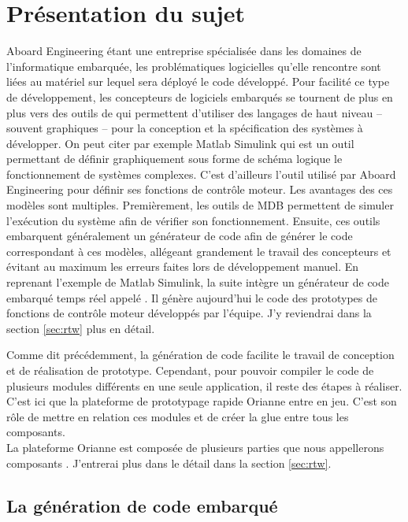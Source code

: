 \chapter{Présentation du sujet}
Aboard Engineering étant une entreprise spécialisée dans les domaines de
l'informatique embarquée, les problématiques logicielles qu'elle rencontre sont
liées au matériel sur lequel sera déployé le code développé. Pour facilité ce
type de développement, les concepteurs de logiciels embarqués se tournent de
plus en plus vers des outils de  qui permettent d'utiliser des langages
de haut niveau -- souvent graphiques -- pour la conception et la spécification
des systèmes à développer. On peut citer par exemple Matlab\up{\circledR}
Simulink\up{\circledR} qui est un outil permettant de définir graphiquement sous
forme de schéma logique le fonctionnement de systèmes complexes. C'est
d'ailleurs l'outil utilisé par Aboard Engineering pour définir ses fonctions de
contrôle moteur. Les avantages des ces modèles sont multiples. Premièrement, les
outils de MDB permettent de simuler l'exécution du système afin de
vérifier son fonctionnement. Ensuite, ces outils embarquent généralement un
générateur de code afin de générer le code correspondant à ces modèles,
allégeant grandement le travail des concepteurs et évitant au maximum les
erreurs faites lors de développement \og manuel\fg{}. En reprenant l'exemple de
Matlab\up{\circledR} Simulink\up{\circledR}, la suite intègre un générateur de
code embarqué temps réel appelé . Il génère aujourd'hui le code des
prototypes de fonctions de contrôle moteur développés par l'équipe. J'y
reviendrai dans la section \ref{sec:rtw} plus en détail.

Comme dit précédemment, la génération de code facilite le travail de conception
et de réalisation de prototype. Cependant, pour pouvoir compiler le code de
plusieurs modules différents en une seule application, il reste des étapes à
réaliser. C'est ici que la plateforme de prototypage rapide Orianne
entre en jeu. C'est son rôle de mettre en relation ces modules et de créer la
\og glue \fg{} entre tous les composants.\\
La plateforme Orianne est composée de plusieurs parties que nous appellerons \og
composants \fg{}. J'entrerai plus dans le détail dans la section \ref{sec:rtw}.

\section{La génération de code embarqué}
